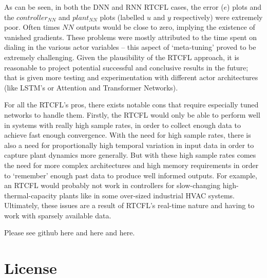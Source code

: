 \documentclass[10pt,twocolumn,letterpaper]{article}
\begin{document}
            As can be seen, in both the DNN and RNN RTCFL cases, the error ($e$) plots and the $controller_{NN}$ and
            $plant_{NN}$ plots (labelled $u$ and $y$ respectively) were extremely poor. Often times $NN$ outputs would
            be close to zero, implying the existence of vanished gradients. These problems were mostly attributed to the
            time spent on dialing in the various actor variables -- this aspect of `meta-tuning' proved to be extremely
            challenging. Given the plausibility of the RTCFL approach, it is reasonable to project potential successful
            and conclusive results in the future; that is given more testing and experimentation with different actor
            architectures (like LSTM's or Attention and Transformer Networks).

            For all the RTCFL's pros, there exists notable cons that require especially tuned networks to handle them.
            Firstly, the RTCFL would only be able to perform well in systems with really high sample rates, in order to
            collect enough data to achieve fast enough convergence. With the need for high sample rates, there is also a
            need for proportionally high temporal variation in input data in order to capture plant dynamics more
            generally. But with these high sample rates comes the need for more complex architectures and high memory
            requirements in order to `remember' enough past data to produce well informed outputs. For example, an RTCFL
            would probably not work in controllers for slow-changing high-thermal-capacity plants like in some
            over-sized industrial HVAC systems. Ultimately, these issues are a result of RTCFL's real-time nature and
            having to work with sparsely available data.

            Please see github here and here and here.
 

    {\small
    
    
    \nocite{*} %
    }

    \section*{License}

        \doclicenseThis
\end{document}
